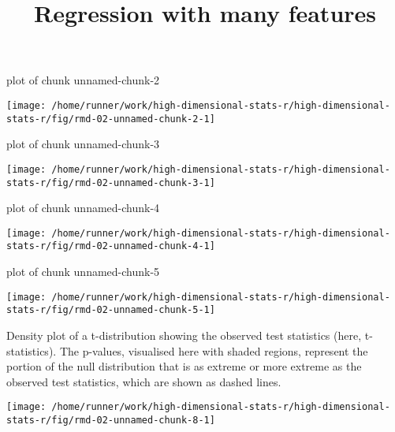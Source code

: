 \documentclass[ignorenonframetext,]{beamer}
\title{Regression with many features}
\author{}
\date{\vspace{-2.5em}}
\begin{document}
\frame{\titlepage}

\begin{frame}{plot of chunk unnamed-chunk-2}
\protect\hypertarget{plot-of-chunk-unnamed-chunk-2}{}

\texttt{[image: /home/runner/work/high-dimensional-stats-r/high-dimensional-stats-r/fig/rmd-02-unnamed-chunk-2-1]}



\end{frame}

\begin{frame}{plot of chunk unnamed-chunk-3}
\protect\hypertarget{plot-of-chunk-unnamed-chunk-3}{}

\texttt{[image: /home/runner/work/high-dimensional-stats-r/high-dimensional-stats-r/fig/rmd-02-unnamed-chunk-3-1]}



\end{frame}

\begin{frame}{plot of chunk unnamed-chunk-4}
\protect\hypertarget{plot-of-chunk-unnamed-chunk-4}{}

\texttt{[image: /home/runner/work/high-dimensional-stats-r/high-dimensional-stats-r/fig/rmd-02-unnamed-chunk-4-1]}



\end{frame}

\begin{frame}{plot of chunk unnamed-chunk-5}
\protect\hypertarget{plot-of-chunk-unnamed-chunk-5}{}

\texttt{[image: /home/runner/work/high-dimensional-stats-r/high-dimensional-stats-r/fig/rmd-02-unnamed-chunk-5-1]}



\end{frame}

\begin{frame}{Density plot of a t-distribution showing the observed test
statistics (here, t-statistics). The p-values, visualised here with
shaded regions, represent the portion of the null distribution that is
as extreme or more extreme as the observed test statistics, which are
shown as dashed lines.}
\protect\hypertarget{density-plot-of-a-t-distribution-showing-the-observed-test-statistics-here-t-statistics.-the-p-values-visualised-here-with-shaded-regions-represent-the-portion-of-the-null-distribution-that-is-as-extreme-or-more-extreme-as-the-observed-test-statistics-which-are-shown-as-dashed-lines.}{}

\texttt{[image: /home/runner/work/high-dimensional-stats-r/high-dimensional-stats-r/fig/rmd-02-unnamed-chunk-8-1]}



\end{frame}
\end{document}
